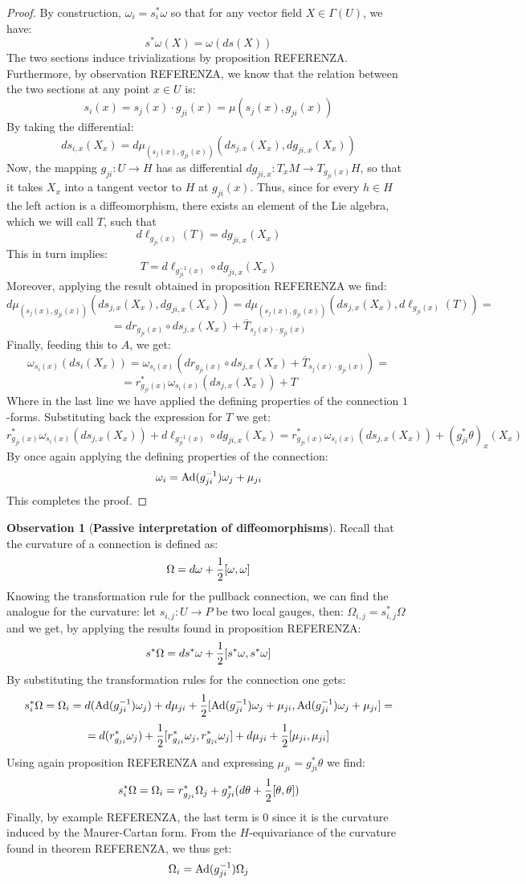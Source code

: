 \documentclass[12pt,a4paper]{report}
\theoremstyle{definition}
\theoremstyle{Theorem}
\theoremstyle{definition}
\theoremstyle{definition}
\newtheorem{Obs}[Def]{Observation}
\begin{document}
	\begin{proof}
		By construction, $\omega_i=s_i^*\omega$ so that for any vector field $X\in \Gamma(U)$, we have:
		$$s^*\omega(X)=\omega(ds(X))$$
		The two sections induce trivializations by proposition REFERENZA. Furthermore, by observation REFERENZA, we know that the relation between the two sections at any point $x\in U$ is:
		$$s_i(x)=s_j(x)\cdot g_{ji}(x)=\mu(s_j(x),g_{ji}(x))$$
		By taking the differential:
		$$ds_{i,x}(X_x)=d\mu_{(s_{j}(x), g_{ji}(x))}(ds_{j,x}(X_x),dg_{ji,x}(X_x))$$
		Now, the mapping $g_{ji}:U\rightarrow H$ has as differential $dg_{ji,x}:T_xM\rightarrow T_{g_{ji}(x)}H$, so that it takes $X_x$ into a tangent vector to $H$ at $g_{ji}(x)$. Thus, since for every $h\in H$ the left action is a diffeomorphism, there exists an element of the Lie algebra, which we will call $T$, such that 
		$$d\ell_{g_{ji}(x)}(T)=dg_{ji,x}(X_x)$$
		This in turn implies:
		$$T=d\ell_{g^{-1}_{ji}(x)}\circ dg_{ji,x}(X_x)$$
		Moreover, applying the result obtained in proposition REFERENZA we find:
		$$d\mu_{(s_{j}(x), g_{ji}(x))}(ds_{j,x}(X_x),dg_{ji,x}(X_x))=d\mu_{(s_{j}(x), g_{ji}(x))}(ds_{j,x}(X_x),d\ell_{g_{ji}(x)}(T))=$$
		$$=dr_{g_{ji}(x)}\circ ds_{j,x}(X_x)+\overline{T}_{s_{j}(x)\cdot g_{ji}(x)}$$
		Finally, feeding this to $A$, we get:
		$$\omega_{s_i(x)}(ds_i(X_x))=\omega_{s_i(x)}(dr_{g_{ji}(x)}\circ ds_{j,x}(X_x)+\overline{T}_{s_{j}(x)\cdot g_{ji}(x)})=$$$$=r^*_{g_{ji}(x)}\omega_{{s_i(x)}}(ds_{j,x}(X_x))+T$$
		Where in the last line we have applied the defining properties of the connection $1$-forms. Substituting back the expression for $T$ we get:
		$$r^*_{g_{ji}(x)}\omega_{{s_i(x)}}(ds_{j,x}(X_x))+d\ell_{g^{-1}_{ji}(x)}\circ dg_{ji,x}(X_x)=r^*_{g_{ji}(x)}\omega_{{s_i(x)}}(ds_{j,x}(X_x))+(g^*_{ji}\theta)_x(X_x)$$
		By once again applying the defining properties of the connection:
		$$\omega_i=\hbox{Ad}(g_{ji}^{-1})\omega_j+\mu_{ji}$$
		This completes the proof.
	\end{proof}
	\begin{Obs}[\textbf{Passive interpretation of diffeomorphisms}]
		Recall that the curvature of a connection is defined as:
		$$\Omega=d\omega+{1\over 2}[\omega,\omega]$$
		Knowing the transformation rule for the pullback connection, we can find the analogue for the curvature: let $s_{i,j}:U\rightarrow P$ be two local gauges, then: $\Omega_{i,j}=s_{i,j}^*\Omega$ and we get, by applying the results found in proposition REFERENZA:
		$$s^*\Omega=ds^*\omega+{1\over 2}[s^*\omega,s^*\omega]$$
		By substituting the transformation rules for the connection one gets:
		$$s_i^*\Omega=\Omega_i=d(\hbox{Ad}(g_{ji}^{-1})\omega_j)+d\mu_{ji}+{1\over 2}[\hbox{Ad}(g_{ji}^{-1})\omega_j+\mu_{ji},\hbox{Ad}(g_{ji}^{-1})\omega_j+\mu_{ji}]=$$
		$$=d(r^*_{g_{ji}}\omega_j)+{1\over 2}[r^*_{g_{ji}}\omega_j,r^*_{g_{ji}}\omega_j]+d\mu_{ji}+{1\over 2}[\mu_{ji},\mu_{ji}]$$
		Using again proposition REFERENZA and expressing $\mu_{ji}=g_{ji}^*\theta$ we find:
		$$s_i^*\Omega=\Omega_i=r^*_{g_{ji}}\Omega_j+g_{ji}^*(d\theta+{1\over 2}[\theta,\theta])$$
		Finally, by example REFERENZA, the last term is 0 since it is the curvature induced by the Maurer-Cartan form. From the $H$-equivariance of the curvature found in theorem REFERENZA, we thus get:
		$$\Omega_i=\hbox{Ad}(g_{ji}^{-1})\Omega_j$$
	\end{Obs}
\end{document}
